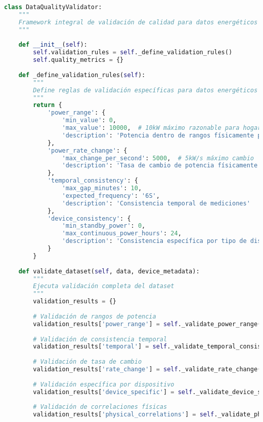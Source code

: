\begin{lstlisting}[language=Python, caption=Framework de validación de calidad de datos]
class DataQualityValidator:
    """
    Framework integral de validación de calidad para datos energéticos
    """
    
    def __init__(self):
        self.validation_rules = self._define_validation_rules()
        self.quality_metrics = {}
    
    def _define_validation_rules(self):
        """
        Define reglas de validación específicas para datos energéticos
        """
        return {
            'power_range': {
                'min_value': 0,
                'max_value': 10000,  # 10kW máximo razonable para hogar
                'description': 'Potencia dentro de rangos físicamente posibles'
            },
            'power_rate_change': {
                'max_change_per_second': 5000,  # 5kW/s máximo cambio
                'description': 'Tasa de cambio de potencia físicamente posible'
            },
            'temporal_consistency': {
                'max_gap_minutes': 10,
                'expected_frequency': '6S',
                'description': 'Consistencia temporal de mediciones'
            },
            'device_consistency': {
                'min_standby_power': 0,
                'max_continuous_power_hours': 24,
                'description': 'Consistencia específica por tipo de dispositivo'
            }
        }
    
    def validate_dataset(self, data, device_metadata):
        """
        Ejecuta validación completa del dataset
        """
        validation_results = {}
        
        # Validación de rangos de potencia
        validation_results['power_range'] = self._validate_power_range(data)
        
        # Validación de consistencia temporal
        validation_results['temporal'] = self._validate_temporal_consistency(data)
        
        # Validación de tasa de cambio
        validation_results['rate_change'] = self._validate_rate_change(data)
        
        # Validación específica por dispositivo
        validation_results['device_specific'] = self._validate_device_specific(data, device_metadata)
        
        # Validación de correlaciones físicas
        validation_results['physical_correlations'] = self._validate_physical_correlations(data)
        

\end{lstlisting}
